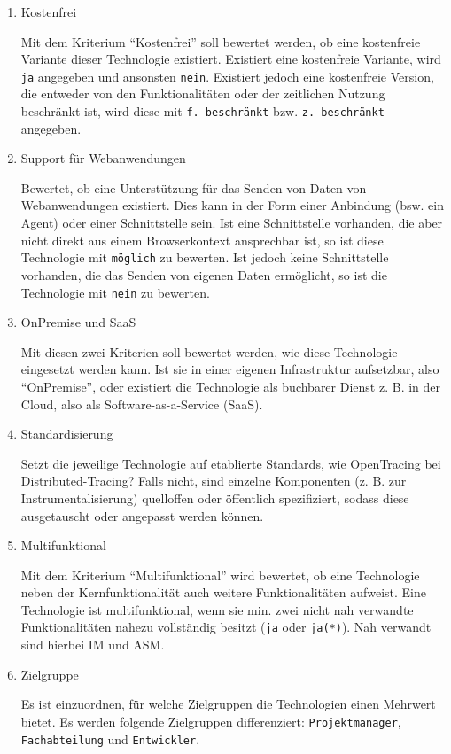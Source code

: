 \begin{enumerate}
	\item Kostenfrei
	\par Mit dem Kriterium \enquote{Kostenfrei} soll bewertet werden, ob eine kostenfreie Variante dieser Technologie existiert. Existiert eine kostenfreie Variante, wird \texttt{ja} angegeben und ansonsten \texttt{nein}. Existiert jedoch eine kostenfreie Version, die entweder von den Funktionalitäten oder der zeitlichen Nutzung beschränkt ist, wird diese mit \texttt{f. beschränkt} bzw. \texttt{z. beschränkt} angegeben.

	\item Support für Webanwendungen
	\par Bewertet, ob eine Unterstützung für das Senden von Daten von Webanwendungen existiert. Dies kann in der Form einer Anbindung (bsw. ein Agent\footnotemark{}) oder einer Schnittstelle sein. Ist eine Schnittstelle vorhanden, die aber nicht direkt aus einem Browserkontext ansprechbar ist, so ist diese Technologie mit \texttt{möglich} zu bewerten. Ist jedoch keine Schnittstelle vorhanden, die das Senden von eigenen Daten ermöglicht, so ist die Technologie mit \texttt{nein} zu bewerten.

	\item OnPremise und SaaS
	\par Mit diesen zwei Kriterien soll bewertet werden, wie diese Technologie eingesetzt werden kann. Ist sie in einer eigenen Infrastruktur aufsetzbar, also \enquote{OnPremise}, oder existiert die Technologie als buchbarer Dienst z. B. in der Cloud, also als Software-as-a-Service (SaaS).

	\item Standardisierung
	\par Setzt die jeweilige Technologie auf etablierte Standards, wie OpenTracing bei Distributed-Tracing? Falls nicht, sind einzelne Komponenten (z. B. zur Instrumentalisierung) quelloffen oder öffentlich spezifiziert, sodass diese ausgetauscht oder angepasst werden können.

	\item Multifunktional
	\par Mit dem Kriterium \enquote{Multifunktional} wird bewertet, ob eine Technologie neben der Kernfunktionalität auch weitere Funktionalitäten aufweist. Eine Technologie ist multifunktional, wenn sie min. zwei nicht nah verwandte Funktionalitäten nahezu vollständig besitzt (\texttt{ja} oder \texttt{ja(*)}). Nah verwandt sind hierbei IM und ASM.

	\item Zielgruppe
	\par Es ist einzuordnen, für welche Zielgruppen die Technologien einen Mehrwert bietet. Es werden folgende Zielgruppen differenziert: \texttt{Projektmanager}, \texttt{Fachabteilung} und \texttt{Entwickler}.
	
\end{enumerate}

